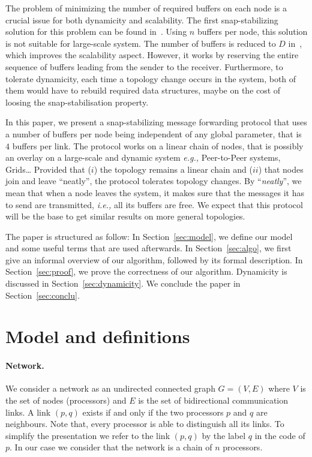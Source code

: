 \documentclass{llncs}
\newcommand{\eg}{\emph{e.g., }}
\newcommand{\ie}{\emph{i.e., }}
\begin{document}
The problem of minimizing the number of required buffers on each node is a crucial issue
for both dynamicity and scalability. 
The first snap-stabilizing solution for this problem can be found in~\cite{CDV09-1}.
Using $n$ buffers per node, this solution is not suitable for large-scale system. 
The number of buffers is reduced to $D$ in~\cite{CDV09-2}, which improves the scalability aspect.  However,
it works by reserving the entire sequence of buffers leading from the sender to the receiver.
Furthermore, to tolerate dynamicity, each time a topology change occurs in the system, 
both of them would have to rebuild required data structures, maybe on the cost of loosing 
the snap-stabilisation property.

In this paper, we present a snap-stabilizing message forwarding protocol that uses 
a number of buffers per node being independent of any global parameter, that is $4$ buffers per 
link. The protocol works on a linear 
chain of nodes, that is possibly an overlay on a large-scale and dynamic system \eg Peer-to-Peer systems, Grids\ldots  
Provided that ($i$) the topology remains a linear chain and ($ii$) that nodes join and leave 
``neatly'', the protocol tolerates topology changes.  By ``{\it neatly}'', we mean that when a node leaves the
system, it makes sure that the messages it has to send are transmitted, \ie all its buffers are free.    
We expect that this protocol will be the base to get similar results on more general topologies. 


The paper is structured as follow: In Section~\ref{sec:model}, we define our model and some useful terms that are used afterwards. 
In Section~\ref{sec:algo}, we first give an informal overview of our algorithm, followed by its formal description. 
In Section~\ref{sec:proof}, we prove the correctness of our algorithm.
Dynamicity is discussed in Section~\ref{sec:dynamicity}. We conclude the paper in Section~\ref{sec:conclu}.  

\section{Model and definitions\label{sec:model}}

\paragraph{\textbf{Network}.} 
We consider a network as an undirected connected graph $G=(V,E)$ where $V$ is the set of nodes (processors) and $E$ is the set of bidirectional communication links. A link $(p,q)$ exists if and only if the two processors $p$ and $q$ are neighbours. Note that, every processor is able to distinguish all its links. To simplify the presentation we refer to the link $(p,q)$ by the label $q$ in the code of $p$. In our case we consider that the network is a chain of $n$ processors.\\
\end{document}
